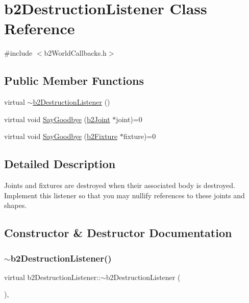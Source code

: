\hypertarget{classb2_destruction_listener}{}\section{b2\+Destruction\+Listener Class Reference}
\label{classb2_destruction_listener}


{\ttfamily \#include $<$b2\+World\+Callbacks.\+h$>$}

\subsection*{Public Member Functions}
\begin{DoxyCompactItemize}
\item 
virtual \mbox{\hyperlink{classb2_destruction_listener_a7bfd35145aeb2b614f6bc529ba1500bf}{$\sim$b2\+Destruction\+Listener}} ()
\item 
virtual void \mbox{\hyperlink{classb2_destruction_listener_a6cd15baa6e5c33118cf7173ab5bf6d58}{Say\+Goodbye}} (\mbox{\hyperlink{classb2_joint}{b2\+Joint}} $\ast$joint)=0
\item 
virtual void \mbox{\hyperlink{classb2_destruction_listener_ab327c0073d162112c38d2fe8f8b9fce3}{Say\+Goodbye}} (\mbox{\hyperlink{classb2_fixture}{b2\+Fixture}} $\ast$fixture)=0
\end{DoxyCompactItemize}


\subsection{Detailed Description}
Joints and fixtures are destroyed when their associated body is destroyed. Implement this listener so that you may nullify references to these joints and shapes. 

\subsection{Constructor \& Destructor Documentation}
\mbox{\label{classb2_destruction_listener_a7bfd35145aeb2b614f6bc529ba1500bf}} 
\subsubsection{\texorpdfstring{$\sim$b2DestructionListener()}{~b2DestructionListener()}}
{\footnotesize\ttfamily virtual b2\+Destruction\+Listener\+::$\sim$b2\+Destruction\+Listener (\begin{DoxyParamCaption}{ }\end{DoxyParamCaption})\hspace{0.3cm}{\ttfamily [inline]}, {\ttfamily [virtual]}}



